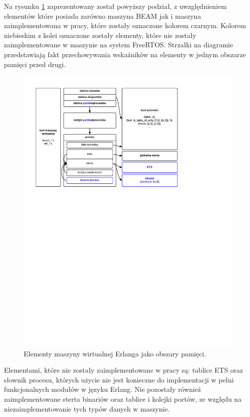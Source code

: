 Na rysunku \ref{fig:ertsmemory} zaprezentowany został powyższy podział, z uwzględnieniem elementów które posiada zarówno maszyna BEAM jak i maszyna zaimplementowana w pracy, które zostały oznaczone kolorem czarnym.
Kolorem niebieskim z kolei oznaczone zostały elementy, które nie zostały zaimplementowane w maszynie na system FreeRTOS.
Strzałki na diagramie przedstawiają fakt przechowywania wskaźników na elementy w jednym obszarze pamięci przed drugi.

\begin{figure}[h]
\centerline{\includegraphics[scale=1, clip, trim=10mm 165mm 55mm 10mm]{erts_memory}}
\caption{Elementy maszyny wirtualnej Erlanga jako obszary pamięci.}
\label{fig:ertsmemory}
\end{figure}

Elementami, które nie zostały zaimplementowane w pracy są: tablice ETS oraz słownik procesu, których użycie nie jest konieczne do implementacji w pełni funkcjonalnych modułów w języku Erlang. Nie pozostały również zaimplementowane sterta binariów oraz tablice i kolejki portów, ze względu na niezaimplementowanie tych typów danych w maszynie.